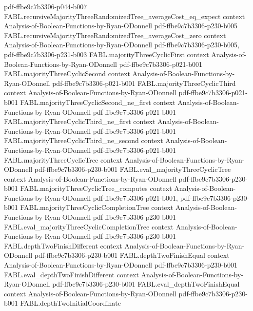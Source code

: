 \begin{theorem}
  {pdf-ffbe9c7b3306-p044-b007}
\proofstep
  {FABL.recursiveMajorityThreeRandomizedTree_averageCost_eq_expect}
  {context}
  {Analysis-of-Boolean-Functions-by-Ryan-ODonnell}
  {pdf-ffbe9c7b3306-p230-b005}
\proofstep
  {FABL.recursiveMajorityThreeRandomizedTree_averageCost_zero}
  {context}
  {Analysis-of-Boolean-Functions-by-Ryan-ODonnell}
  {pdf-ffbe9c7b3306-p230-b005,
    pdf-ffbe9c7b3306-p231-b003}
\proofstep
  {FABL.majorityThreeCyclicFirst}
  {context}
  {Analysis-of-Boolean-Functions-by-Ryan-ODonnell}
  {pdf-ffbe9c7b3306-p021-b001}
\proofstep
  {FABL.majorityThreeCyclicSecond}
  {context}
  {Analysis-of-Boolean-Functions-by-Ryan-ODonnell}
  {pdf-ffbe9c7b3306-p021-b001}
\proofstep
  {FABL.majorityThreeCyclicThird}
  {context}
  {Analysis-of-Boolean-Functions-by-Ryan-ODonnell}
  {pdf-ffbe9c7b3306-p021-b001}
\proofstep
  {FABL.majorityThreeCyclicSecond_ne_first}
  {context}
  {Analysis-of-Boolean-Functions-by-Ryan-ODonnell}
  {pdf-ffbe9c7b3306-p021-b001}
\proofstep
  {FABL.majorityThreeCyclicThird_ne_first}
  {context}
  {Analysis-of-Boolean-Functions-by-Ryan-ODonnell}
  {pdf-ffbe9c7b3306-p021-b001}
\proofstep
  {FABL.majorityThreeCyclicThird_ne_second}
  {context}
  {Analysis-of-Boolean-Functions-by-Ryan-ODonnell}
  {pdf-ffbe9c7b3306-p021-b001}
\proofstep
  {FABL.majorityThreeCyclicTree}
  {context}
  {Analysis-of-Boolean-Functions-by-Ryan-ODonnell}
  {pdf-ffbe9c7b3306-p230-b001}
\proofstep
  {FABL.eval_majorityThreeCyclicTree}
  {context}
  {Analysis-of-Boolean-Functions-by-Ryan-ODonnell}
  {pdf-ffbe9c7b3306-p230-b001}
\proofstep
  {FABL.majorityThreeCyclicTree_computes}
  {context}
  {Analysis-of-Boolean-Functions-by-Ryan-ODonnell}
  {pdf-ffbe9c7b3306-p021-b001,
    pdf-ffbe9c7b3306-p230-b001}
\proofstep
  {FABL.majorityThreeCyclicCompletionTree}
  {context}
  {Analysis-of-Boolean-Functions-by-Ryan-ODonnell}
  {pdf-ffbe9c7b3306-p230-b001}
\proofstep
  {FABL.eval_majorityThreeCyclicCompletionTree}
  {context}
  {Analysis-of-Boolean-Functions-by-Ryan-ODonnell}
  {pdf-ffbe9c7b3306-p230-b001}
\proofstep
  {FABL.depthTwoFinishDifferent}
  {context}
  {Analysis-of-Boolean-Functions-by-Ryan-ODonnell}
  {pdf-ffbe9c7b3306-p230-b001}
\proofstep
  {FABL.depthTwoFinishEqual}
  {context}
  {Analysis-of-Boolean-Functions-by-Ryan-ODonnell}
  {pdf-ffbe9c7b3306-p230-b001}
\proofstep
  {FABL.eval_depthTwoFinishDifferent}
  {context}
  {Analysis-of-Boolean-Functions-by-Ryan-ODonnell}
  {pdf-ffbe9c7b3306-p230-b001}
\proofstep
  {FABL.eval_depthTwoFinishEqual}
  {context}
  {Analysis-of-Boolean-Functions-by-Ryan-ODonnell}
  {pdf-ffbe9c7b3306-p230-b001}
\proofstep
  {FABL.depthTwoInitialCoordinate}

\end{theorem}
